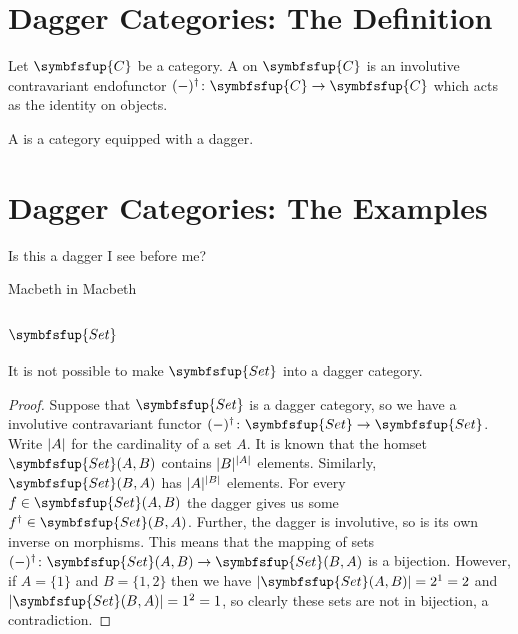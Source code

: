 \documentclass[fleqn]{NotesClass}
\makeatletter
\newcommand{\cat}[1]{\symbfsfup{#1}}
\newcommand{\c@egory}[1]{\symbfsfup{#1}}
\newcommand{\Set}{\c@egory{Set}}
\DeclarePairedDelimiter{\cardinality}{\lvert}{\rvert}
\makeatother
\begin{document}
    \section{Dagger Categories: The Definition}
    \begin{dfn}{}{}
        Let \(\cat{C}\) be a category.
        A  on \(\cat{C}\) is an involutive contravariant endofunctor \((-)^\dagger \colon \cat{C} \to \cat{C}\) which acts as the identity on objects.
        
        A  is a category equipped with a dagger.
    \end{dfn}
    
    \section{Dagger Categories: The Examples}
    \epigraph{Is this a dagger I see before me?}{Macbeth in Macbeth}
    \subsection{\texorpdfstring{\(\Set\)}{Set}}
    \begin{lma}{}{}
        It is not possible to make \(\Set\) into a dagger category.
        
        \begin{proof}
            Suppose that \(\Set\) is a dagger category, so we have a involutive contravariant functor \((-)^{\dagger} \colon \Set \to \Set\).
            Write \(\cardinality{A}\) for the cardinality of a set \(A\).
            It is known that the homset \(\Set(A, B)\) contains \(\cardinality{B}^{\cardinality{A}}\) elements.
            Similarly, \(\Set(B, A)\) has \(\cardinality{A}^{\cardinality{B}}\) elements.
            For every \(f \in \Set(A, B)\) the dagger gives us some \(f^\dagger \in \Set(B, A)\).
            Further, the dagger is involutive, so is its own inverse on morphisms.
            This means that the mapping of sets \((-)^{\dagger} \colon \Set(A, B) \to \Set(B, A)\) is a bijection.
            However, if \(A = \{1\}\) and \(B = \{1, 2\}\) then we have \(\cardinality{\Set(A, B)} = 2^1 = 2\) and \(\cardinality{\Set(B, A)} = 1^2 = 1\), so clearly these sets are not in bijection, a contradiction.
        \end{proof}
    \end{lma}
    
\end{document}
